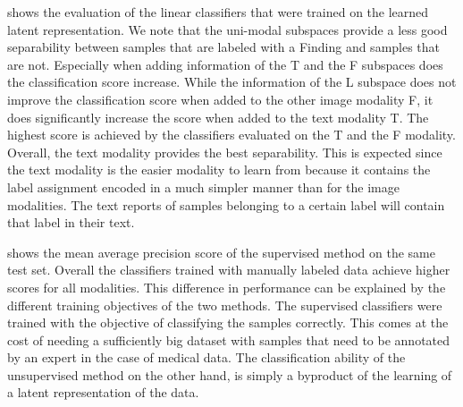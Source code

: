 \documentclass{midl} %
\begin{document}
    
    
     shows the evaluation of the linear classifiers that were trained on the learned latent representation.
    We note that the uni-modal subspaces provide a less good separability between samples that are labeled with a Finding and samples that are not.
    Especially when adding information of the T and the F subspaces does the classification score increase.
    While the information of the L subspace does not improve the classification score when added to the other image modality F, it does significantly increase the score when added to the text modality T.
    The highest score is achieved by the classifiers evaluated on the T and the F modality.
    Overall, the text modality provides the best separability.
    This is expected since the text modality is the easier modality to learn from because it contains the label assignment encoded in a much simpler manner than for the image modalities.
    The text reports of samples belonging to a certain label will contain that label in their text.
    
     shows the mean average precision score of the supervised method on the same test set.
    Overall the classifiers trained with manually labeled data achieve higher scores for all modalities.
    This difference in performance can be explained by the different training objectives of the two methods.
    The supervised classifiers were trained with the objective of classifying the samples correctly.
    This comes at the cost of needing a sufficiently big dataset with samples that need to be annotated by an expert in the case of medical data.
    The classification ability of the unsupervised method on the other hand, is simply a byproduct of the learning of a latent representation of the data.
    
    
\end{document}
